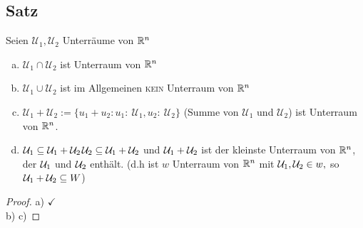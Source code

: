 \subsection{Satz}\label{sec:0.4}
Seien $\mathcal{U}_1,\mathcal{U}_2$ Unterräume von $\mathbb{R}^n$
\begin{enumerate}[a)]
\item $\mathcal{U}_1 \cap \mathcal{U}_2$ ist Unterraum von $\mathbb{R}^n$
\item $\mathcal{U}_1 \cup \mathcal{U}_2$ ist im Allgemeinen \textsc{kein} Unterraum von $\mathbb{R}^n$
\item $\mathcal{U}_1 + \mathcal{U}_2 := \{u_1 + u_2 : u_1:\: \mathcal{U}_1, u_2:\: \mathcal{U}_2\}$
(Summe von $\mathcal{U}_1$ und $\mathcal{U}_2$) ist Unterraum von $\mathbb{R}^n$.
\item $\mathcal{U}_1 \subseteq \mathcal{U}_1 + \mathcal{U}_2$\quad$\mathcal{U}_2 \subseteq \mathcal{U}_1+\mathcal{U}_2$ und $\mathcal{U}_1 + \mathcal{U}_2$ ist der kleinste Unterraum von $\mathbb{R}^n$, der $\mathcal{U}_1$ und $\mathcal{U}_2$ enthält. (d.h ist $w$ Unterraum von $\mathbb{R}^n$ mit $\mathcal{U}_1,\mathcal{U}_2 \in w,$ so $\mathcal{U}_1 + \mathcal{U}_2 \subseteq W$)
\end{enumerate}
\begin{proof}
a) $\checkmark$\\
b) %
c) %
\end{proof}
